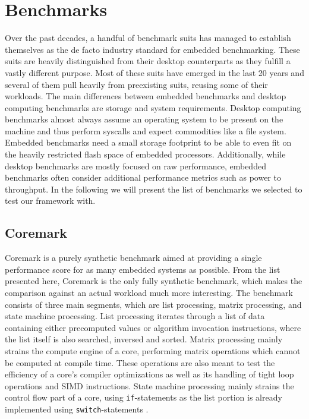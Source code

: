 \documentclass[../bachelor_paper.tex]{subfiles}
\begin{document}
\chapter{Benchmarks}
    \label{ch:bench}

Over the past decades, a handful of benchmark suits has managed to establish themselves as the de facto industry standard for embedded benchmarking. These suits are heavily distinguished from their desktop counterparts as they fulfill a vastly different purpose. Most of these suits have emerged in the last 20 years and several of them pull heavily from preexisting suits, reusing some of their workloads. The main differences between embedded benchmarks and desktop computing benchmarks are storage and system requirements. Desktop computing benchmarks almost always assume an operating system to be present on the machine and thus perform syscalls and expect commodities like a file system. Embedded benchmarks need a small storage footprint to be able to even fit on the heavily restricted flash space of embedded processors. Additionally, while desktop benchmarks are mostly focused on raw performance, embedded benchmarks often consider additional performance metrics such as power to throughput. In the following we will present the list of benchmarks we selected to test our framework with.

\section{Coremark}
Coremark is a purely synthetic benchmark aimed at providing a single performance score for as many embedded systems as possible. From the list presented here, Coremark is the only fully synthetic benchmark, which makes the comparison against an actual workload much more interesting. The benchmark consists of three main segments, which are list processing, matrix processing, and state machine processing. List processing iterates through a list of data containing either precomputed values or algorithm invocation instructions, where the list itself is also searched, inversed and sorted. Matrix processing mainly strains the compute engine of a core, performing matrix operations which cannot be computed at compile time. These operations are also meant to test the efficiency of a core's compiler optimizations as well as its handling of tight loop operations and \ac{SIMD} instructions. State machine processing mainly strains the control flow part of a core, using \texttt{if}-statements as the list portion is already implemented using \texttt{switch}-statements \cite{gal-onExploringCoremarkBenchmark2012}.
\end{document}
